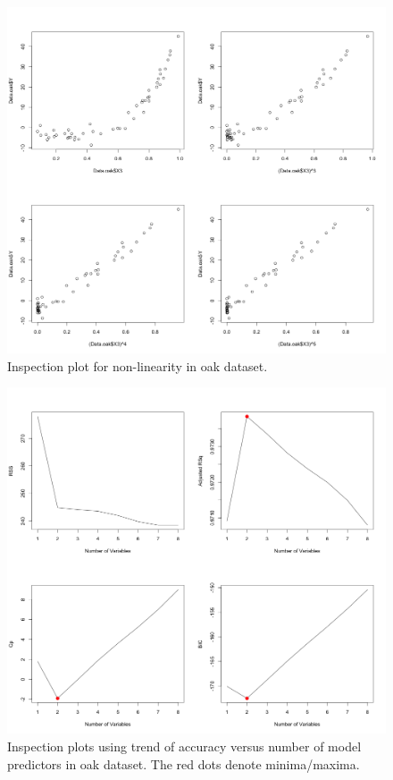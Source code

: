 \documentclass{article}
\begin{document}
\begin{figure}[h!]
  \includegraphics[width=\linewidth]{project/images/08-oak.png}
  \caption{Inspection plot for non-linearity in oak dataset.}
  \label{fig:08-oak}
\end{figure}

\begin{figure}[h!]
  \includegraphics[width=\linewidth]{project/images/09-oak.png}
  \caption{Inspection plots using trend of accuracy versus number of model predictors in oak dataset. The red dots denote minima/maxima.}
  \label{fig:09-oak}
\end{figure}
\end{document}
